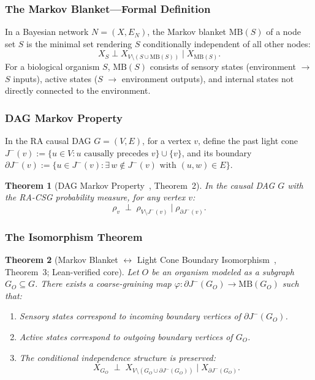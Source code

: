 \documentclass[11pt,a4paper]{article}
\theoremstyle{plain}
\newtheorem{theorem}{Theorem}[section]
\theoremstyle{definition}
\theoremstyle{remark}
\begin{document}
\subsubsection{The Markov Blanket---Formal Definition}

In a Bayesian network $N = (X, E_{N})$, the Markov blanket $\mathrm{MB}(S)$ of a
node set $S$ is the minimal set rendering $S$ conditionally independent of all
other nodes:
\begin{equation}
  X_{S} \perp X_{V\setminus(S\cup\mathrm{MB}(S))} \mid X_{\mathrm{MB}(S)}.
\end{equation}
For a biological organism $S$, $\mathrm{MB}(S)$ consists of sensory states
(environment $\to$ $S$ inputs), active states ($S$ $\to$ environment outputs), and
internal states not directly connected to the environment.

\subsubsection{DAG Markov Property}

In the RA causal DAG $G = (V, E)$, for a vertex $v$, define the past light cone
$J^{-}(v) := \{u \in V : u \text{ causally precedes } v\} \cup \{v\}$, and its
boundary
$\partial J^{-}(v) := \{u \in J^{-}(v) : \exists\, w \notin J^{-}(v) \text{ with }
(u,w)\in E\}$.

\begin{theorem}[DAG Markov Property~{\normalfont\citep{Sandeman2026RAHC},
Theorem~2}]
\label{thm:dag-markov}
In the causal DAG $G$ with the RA-CSG probability measure, for any vertex $v$:
\begin{equation}
  \rho_{v} \;\perp\; \rho_{V \setminus J^{-}(v)}
  \;\Big|\; \rho_{\partial J^{-}(v)}.
\end{equation}
\end{theorem}

\subsubsection{The Isomorphism Theorem}

\begin{theorem}[Markov Blanket $\leftrightarrow$ Light Cone Boundary
Isomorphism~{\normalfont\citep{Sandeman2026RAHC}, Theorem~3;
\textup{Lean-verified core}}]
\label{thm:iso}
Let $O$ be an organism modeled as a subgraph $G_{O} \subseteq G$. There exists a
coarse-graining map $\varphi: \partial J^{-}(G_{O}) \to \mathrm{MB}(G_{O})$ such
that:
\begin{enumerate}[label=\emph{(\alph*)}]
  \item Sensory states correspond to incoming boundary vertices of
    $\partial J^{-}(G_{O})$.
  \item Active states correspond to outgoing boundary vertices of $G_{O}$.
  \item The conditional independence structure is preserved:
  \begin{equation}
    X_{G_{O}} \;\perp\; X_{V \setminus (G_{O} \cup \partial J^{-}(G_{O}))}
    \;\Big|\; X_{\partial J^{-}(G_{O})}.
  \end{equation}
\end{enumerate}
\end{theorem}
\end{document}
